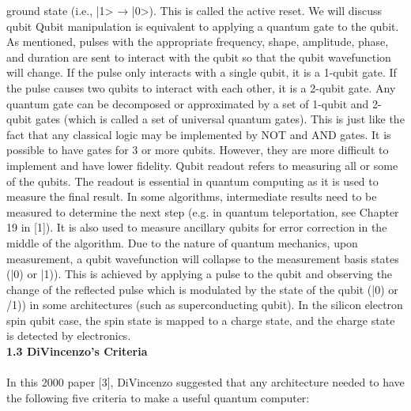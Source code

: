 \documentclass{article}
\begin{document}
ground state (i.e., |1> → |0>). This is called the active reset. We will discuss qubit Qubit manipulation is equivalent to applying a quantum gate to the qubit. As mentioned, pulses with the appropriate frequency, shape, amplitude, phase, and
duration are sent to interact with the qubit so that the qubit wavefunction will change. If the pulse only interacts with a single qubit, it is a 1-qubit gate. If the pulse causes two qubits to interact with each other, it is a 2-qubit gate. Any quantum gate can be decomposed or approximated by a set of 1-qubit and 2-qubit gates (which is called a set of universal quantum gates). This is just like the fact that any classical logic may be implemented by NOT and AND gates. It is possible to have gates for 3 or more qubits. However, they are more difficult to implement and have lower fidelity.
Qubit readout refers to measuring all or some of the qubits. The readout is essential in quantum computing as it is used to measure the final result. In some algorithms, intermediate results need to be measured to determine the next step (e.g. in quantum teleportation, see Chapter 19 in [1]). It is also used to measure ancillary qubits for error correction in the middle of the algorithm. Due to the nature of quantum mechanics, upon measurement, a qubit wavefunction will collapse to the measurement basis states (|0) or |1)). This is achieved by applying a pulse to the qubit and observing the change of the reflected pulse which is modulated by the state of the qubit (|0) or /1)) in some architectures (such as superconducting qubit). In the silicon electron spin qubit case, the spin state is mapped to a charge state, and the charge state is detected by electronics.
\\[20pt]
\textbf{\large 1.3 DiVincenzo’s Criteria}
\\\\
In this 2000 paper [3], DiVincenzo suggested that any architecture needed to have the following five criteria to make a useful quantum computer:
\end{document}
